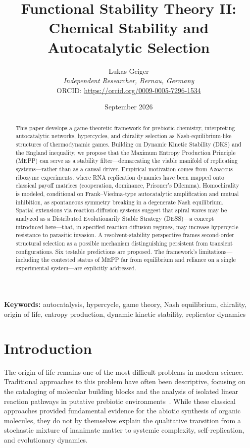 \documentclass[12pt,a4paper]{article}
\title{Functional Stability Theory II: Chemical Stability and Autocatalytic Selection}
\author{Lukas Geiger\\
\textit{Independent Researcher, Bernau, Germany}\\
ORCID: \url{https://orcid.org/0009-0005-7296-1534}}
\date{September 2026}
\theoremstyle{remark}
\begin{document}
\maketitle

\begin{abstract}
This paper develops a game-theoretic framework for prebiotic chemistry, interpreting autocatalytic networks, hypercycles, and chirality selection as Nash-equilibrium-like structures of thermodynamic games. Building on Dynamic Kinetic Stability (DKS) and the England inequality, we propose that the Maximum Entropy Production Principle (MEPP) can serve as a stability filter---demarcating the viable manifold of replicating systems---rather than as a causal driver. Empirical motivation comes from Azoarcus ribozyme experiments, where RNA replication dynamics have been mapped onto classical payoff matrices (cooperation, dominance, Prisoner's Dilemma). Homochirality is modeled, conditional on Frank--Viedma-type autocatalytic amplification and mutual inhibition, as spontaneous symmetry breaking in a degenerate Nash equilibrium. Spatial extensions via reaction-diffusion systems suggest that spiral waves may be analyzed as a Distributed Evolutionarily Stable Strategy (DESS)---a concept introduced here---that, in specified reaction-diffusion regimes, may increase hypercycle resistance to parasitic invasion. A resolvent-stability perspective frames second-order structural selection as a possible mechanism distinguishing persistent from transient configurations. Six testable predictions are proposed. The framework's limitations---including the contested status of MEPP far from equilibrium and reliance on a single experimental system---are explicitly addressed.
\end{abstract}

\textbf{Keywords:} autocatalysis, hypercycle, game theory, Nash equilibrium, chirality, origin of life, entropy production, dynamic kinetic stability, replicator dynamics

\clearpage

\tableofcontents

\clearpage

\section{Introduction}
\label{sec:introduction}

The origin of life remains one of the most difficult problems in modern science. Traditional approaches to this problem have often been descriptive, focusing on the cataloging of molecular building blocks and the analysis of isolated linear reaction pathways in putative prebiotic environments~\citep{MillerUrey}. While these classical approaches provided fundamental evidence for the abiotic synthesis of organic molecules, they do not by themselves explain the qualitative transition from a stochastic mixture of inanimate matter to systemic complexity, self-replication, and evolutionary dynamics.
\end{document}
